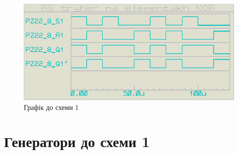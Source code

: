 \documentclass{article}
\begin{document}
\begin{normalsize}
	\begin{figure}[H]
		\centering
		\includegraphics[scale=0.25]{g1}	
		\caption{Графік до схеми 1}
	\end{figure}
	
	\section*{Генератори до схеми 1}
	\begin{figure}[H]
		\centering
		\hspace{5px}
	\end{figure}


\end{normalsize}
\end{document}
